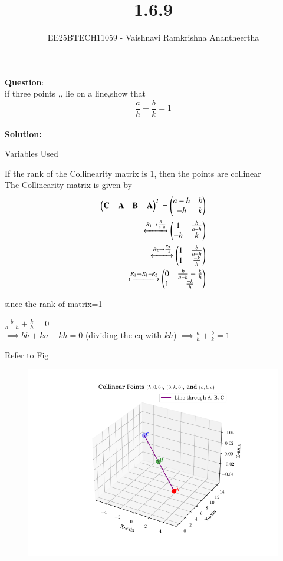 \documentclass[journal]{IEEEtran}
\title{1.6.9}
\author{EE25BTECH11059 - Vaishnavi Ramkrishna Anantheertha}
\begin{document}
\maketitle

\renewcommand{\thefigure}{\theenumi}
\renewcommand{\thetable}{\theenumi}


\textbf{Question}:\\
if three points ,, lie on a line,show that
\[
\frac{a}{h} + \frac{b}{k} = 1
\]
\\
\textbf{Solution: }
\begin{table}[H]    
  \centering
  
  \caption{Variables Used}
  \label{tab:1.6.9}
\end{table}
If the rank of the Collinearity matrix is $1$, then the points are collinear\\
   The Collinearity matrix is given by\\
\begin{align}
    \begin{pmatrix}
    \mathbf{C}-\mathbf{A} & \mathbf{B}-\mathbf{A}
  \end{pmatrix}^T = \begin{pmatrix}
    a-h & b
    \\
    -h & k
    \end{pmatrix}\\
  \xleftrightarrow[]{R_1 \rightarrow {\frac{R_1}{a-h}}}
 \begin{pmatrix}
    1 & \frac{b}{a-h}
    \\
    -h & k
    \end{pmatrix}\\
     \xleftrightarrow[]{R_2 \rightarrow {\frac{R_2}{-h}}}
 \begin{pmatrix}
     1 & \frac{b}{a-h}
    \\
     1 & \frac{-k}{h}
    \end{pmatrix}\\
       \xleftrightarrow[]{R_1 \rightarrow R_1- R_2}
 \begin{pmatrix}
    0 & \frac{b}{a-h}+\frac{k}{h} 
    \\
    1 & \frac{-k}{h}
      \end{pmatrix} 
\end{align}

since the rank of matrix=1
\begin{center}
$\frac{b}{a-h}+\frac{k}{h} =0$ 
\\
$\implies bh+ka-kh=0$ (dividing the eq with $kh$)
$\implies \frac{a}{h}+\frac{b}{k}=1$
\end{center}
Refer to Fig

\begin{figure}[H]
\begin{center}
\includegraphics[width=0.6\columnwidth]{figs/graph1.png}
\end{center}
\caption{}
\label{fig:Fig}
\end{figure}
\end{document}
